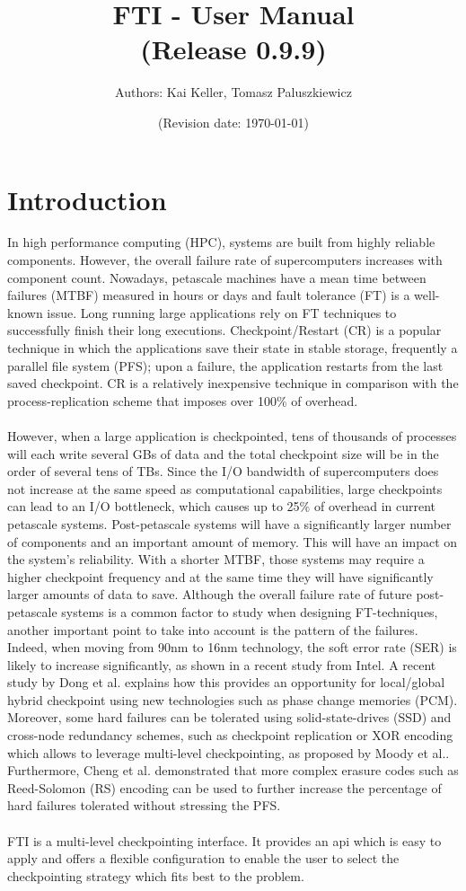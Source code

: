 \documentclass{refrep}
\title{FTI - User Manual  \\ {\small(Release 0.9.9)}}
\author{Authors: Kai Keller, Tomasz Paluszkiewicz}
\date{\small (Revision date: \today)}
\begin{document}
\maketitle
\tableofcontents
\newpage
\chapter{Introduction}\label{ch:introduction}
In high performance computing (HPC), systems are built from highly reliable components. However, the overall failure rate of supercomputers increases with component count. Nowadays, petascale machines have a mean time between failures (MTBF) measured in hours or days and fault tolerance (FT) is a well-known issue. Long running large applications rely on FT techniques to successfully finish their long executions. Checkpoint/Restart (CR) is a popular technique in which the applications save their state in stable storage, frequently a parallel file system (PFS); upon a failure, the application restarts from the last saved checkpoint. CR is a relatively inexpensive technique in comparison with the process-replication scheme that imposes over 100\% of overhead.
\\{}\\
However, when a large application is checkpointed, tens of thousands of processes will each write several GBs of data and the total checkpoint size will be in the order of several tens of TBs. Since the I/O bandwidth of supercomputers does not increase at the same speed as computational capabilities, large checkpoints can lead to an I/O bottleneck, which causes up to 25\% of overhead in current petascale systems. Post-petascale systems will have a significantly larger number of components and an
important amount of memory. This will have an impact on the system's reliability. With a shorter MTBF, those systems may require a higher checkpoint frequency and at the same time they will have significantly larger amounts of data to save. Although the overall failure rate of future post-petascale systems is a common factor to study when designing FT-techniques, another important point to take into account is the pattern of the failures. Indeed, when moving from 90nm to 16nm technology, the soft error rate (SER) is likely to increase significantly, as shown in a recent study from Intel. A recent study by Dong et al. explains how this provides an opportunity for local/global hybrid checkpoint using new technologies such as phase change memories (PCM). Moreover, some hard failures can be tolerated using solid-state-drives (SSD) and cross-node redundancy schemes, such as checkpoint replication or XOR encoding which allows to leverage multi-level checkpointing, as proposed by Moody et al.. Furthermore, Cheng et al. demonstrated that more complex erasure codes such as Reed-Solomon (RS) encoding can be used to further increase the percentage of hard failures tolerated without stressing the PFS.
\\{}\\
FTI is a multi-level checkpointing interface. It provides an api which is easy to apply and offers a flexible configuration to enable the user to select the checkpointing strategy which fits best to the problem.
\end{document}
